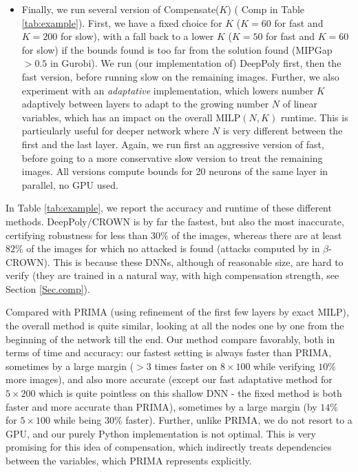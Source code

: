 \documentclass{llncs}
\newcommand{\MILP}{{\textrm{MILP}}}
\begin{document}
\begin{itemize}
	\item Finally, we run several version of Compensate($K$) ({\color{blue} Comp} in Table \ref{tab:example}). First, we have a fixed choice for $K$ ($K=60$ for fast and $K=200$ for slow), with a fall back to a lower $K$ ($K=50$ for fast and $K=60$ for slow) if the bounds found is too far from the solution found (MIPGap $>0.5$ in Gurobi). We run (our implementation of) DeepPoly first, then the fast version, before running slow on the remaining images.
	Further, we also experiment with an {\em adaptative} implementation, which lowers number $K$ adaptively between layers to adapt to the growing number $N$ of linear variables, which has an impact on the overall $\MILP(N,K)$ runtime. This is particularly useful for deeper network where $N$ is very different between the first and the last layer. Again, we run first an aggressive version of fast, before going to a more conservative slow version to treat the remaining images. All versions compute bounds for 20 neurons of the same layer in parallel, no GPU used.
\end{itemize}


In Table \ref{tab:example}, we report the accuracy and runtime of these different methods.
DeepPoly/CROWN is by far the fastest, but also the most inaccurate, certifying robustness for less than $30\%$ of the images, whereas there are at least $82\%$ of the images for which no attacked is found (attacks computed by \cite{attack} in $\beta$-CROWN).
This is because these DNNs, although of reasonable size, are hard to verify (they are trained in a natural way, with high compensation strength, see Section \ref{Sec.comp}).


Compared with PRIMA (using refinement of the first few layers by exact MILP), the overall method is quite similar, looking at all the nodes one by one from the beginning of the network till the end. Our method compare favorably, both in terms of time and accuracy: our fastest setting is always faster than PRIMA, sometimes by a large margin ($>3$ times faster on $8 \times 100$ while verifying $10\%$ more images), and also more accurate (except our fast adaptative method for $5 \times 200$ which is quite pointless on this shallow DNN - the fixed method is both faster and more accurate than PRIMA), sometimes by a large margin (by $14 \%$  for $5 \times 100$ while being $30\%$ faster). Further, unlike PRIMA, we do not resort to a GPU, and our purely Python implementation is not optimal. This is very promising for this idea of compensation, which indirectly treats dependencies between the variables, which PRIMA represents explicitly.
\end{document}
